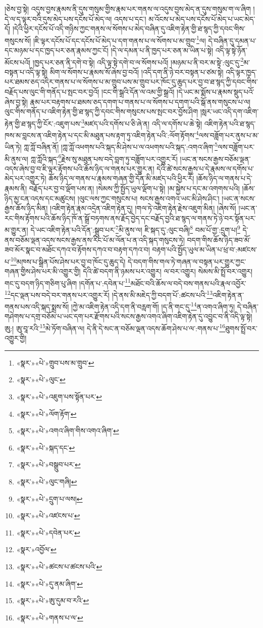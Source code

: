 །ཅེས་བྱ་སྟེ། འདུས་བྱས་རྣམས་ནི་དུས་གསུམ་གྱིས་རྣམ་པར་གནས་ལ་འདུས་བྱས་མེད་ན་དུས་གསུམ་ག་ལ་ཞིག །དེ་ལ་ད་ལྟར་བའི་དུས་མེད་པས་དངོས་པོ་མེད་ལ། འདས་པ་དང་། མ་འོངས་པ་མེད་པས་དངོས་པོ་མེད་པ་ཡང་མེད་དོ། །དེའི་ཕྱིར་དངོས་པོ་འདི་གཉིས་ཀྱང་གནས་ལ་སོགས་པ་མེད་བཞིན་དུ་འཇིག་རྟེན་གྱི་ཐ་སྙད་ཀྱི་དབང་གིས་གསུངས་སོ། །ཇི་ལྟར་དངོས་པོ་དང་དངོས་པོ་མེད་པ་དག་གནས་པ་ལ་སོགས་པ་མ་གྲུབ་\footnote{«སྣར་»«པེ་»གྲུབ་པས་མ་གྲུབ་}ལ། དེ་བཞིན་དུ་དམན་པ་དང་མཉམ་པ་དང་ཁྱད་པར་ཅན་རྣམས་ཀྱང་ངོ། །དེ་ལ་དམན་པ་ནི་ཁྱད་པར་ཅན་མ་ཡིན་པ་སྟེ། འདི་ལྟ་སྟེ་ཉོན་མོངས་པའོ། །ཁྱད་པར་ཅན་ནི་དགེ་བ་སྟེ། འདི་ལྟ་སྟེ་དགེ་བ་ལ་སོགས་པའོ། །མཉམ་པ་ནི་བར་མ་སྟེ་:ལུང་དུ་\footnote{«སྣར་»«པེ་»ལུང་}མ་བསྟན་པ་འདི་ལྟ་སྟེ། མིག་ལ་སོགས་པ་རྣམས་སོ་ཞེས་བྱ་བའོ། །འདི་དག་ནི་ཉེ་བར་བསྟན་པ་ཙམ་སྟེ། འདི་ལྟར་ཁྱད་པར་ཐམས་ཅད་འདིར་གནས་པ་ལ་སོགས་པ་མ་གྲུབ་པས་མ་གྲུབ་པར་ཁོང་དུ་ཆུད་པར་བྱ་བ་ཐ་སྙད་ཀྱི་དབང་གིས་བརྗོད་པས་ལུང་གི་གནོད་པ་སྤང་བར་བྱའོ། །ངང་གི་སྒྲའི་དོན་ལ་འམ་གྱི་སྒྲའོ། །དེ་ཡང་མ་སྨོས་པ་རྣམས་སྡུད་པའོ་ཞེས་བྱ་སྟེ། རྣམ་པར་བརྟགས་པ་ཐམས་ཅད་དགག་པ་གནས་པ་ལ་སོགས་པ་དགག་པའི་སྒོ་ནས་གསུངས་པ་ལ། ལུང་གིས་གནོད་པ་འཇིག་རྟེན་གྱི་ཐ་སྙད་ཀྱི་དབང་གིས་གསུངས་པས་སྤང་བར་བྱོས་ཤིག །སླར་ཡང་འདི་དག་འཇིག་རྟེན་གྱི་ཐ་སྙད་ཀྱི་ངོར་:འཇུག་པས་\footnote{«སྣར་»«པེ་»འཇུག་པས་སྟོན་པར་}མཛད་པའི་དགོས་པ་ཅི་ཞེ་ན། འདི་ལ་དགོས་པ་ཆེ་སྟེ། འཇིག་རྟེན་པའི་ཐ་སྙད་ཁས་མ་བླངས་ན་འཇིག་རྟེན་པ་དང་མི་མཐུན་པས་རྟག་ཏུ་འཇིག་རྟེན་པའི་:ལོག་རྟོགས་\footnote{«སྣར་»«པེ་»ལོག་རྟོག་}ལས་བཟློག་པར་ནུས་པ་མ་ཡིན་ཏེ། ཀླ་ཀློ་བཞིན་ནོ། །ཀླ་ཀློ་འཕགས་པའི་སྐད་མི་ཤེས་པ་ལ་འཕགས་པའི་སྐད་:འགའ་ཞིག་\footnote{«སྣར་»«པེ་»འགའ་ཞིག་གིས་འགའ་ཞིག་}ལས་བཟློག་པར་མི་ནུས་ལ། ཀླ་ཀློའི་སྐད་\footnote{«སྣར་»«པེ་»སྐད་དང་}རྗེས་སུ་མཐུན་པས་བདེ་བླག་ཏུ་བཟློག་པར་འགྱུར་རོ། །ཡང་ན་སངས་རྒྱས་བཅོམ་ལྡན་འདས་ཞེས་བྱ་བ་ཇི་ལྟར་རྟོགས་པའི་ཆོས་ཉིད་ལ་གནས་པར་གྱུར་ན། དེའི་ཚེ་སངས་རྒྱས་པ་དེ་རྣམས་ལ་དགོས་པ་མེད་པར་འགྱུར་ཏེ། ཆོས་ཉིད་ལ་གནས་པ་རྣམས་གཞན་གྱི་དོན་མི་མཛད་པའི་ཕྱིར་རོ། །ཆོས་ཉིད་ལ་གནས་པ་དེ་རྣམས་ནི། བརྗོད་པར་བྱ་བ་ལྡོག་པས་ན། །སེམས་ཀྱི་སྤྱོད་ཡུལ་ལྡོག་པ་སྟེ། །མ་སྐྱེས་པ་དང་མ་འགགས་པའི། །ཆོས་ཉིད་མྱ་ངན་འདས་དང་མཚུངས། །ལུང་ལས་ཀྱང་གསུངས་པ། སངས་རྒྱས་འགའ་ཡང་མི་ཤེས་ཤིང་། །ཡང་ན་སངས་རྒྱས་ཆོས་ཉིད་མིན། །འཇིག་རྟེན་རྣམ་འདྲེན་འཇིག་རྟེན་དུ། །གལ་ཏེ་འཇིག་རྟེན་རྗེས་འཇུག་མིན། །ཞེས་སོ། །ཡང་ན་རང་གིས་རྟོགས་པའི་ཆོས་ཉིད་ཁོ་ན་སྒྲོ་བཏགས་ནས་རྗོད་བྱེད་དང་བརྗོད་བྱའི་ཐ་སྙད་ལ་གནས་ཏེ་ཉེ་བར་སྟོན་པར་མ་གྱུར་ན། དེ་ཡང་འཇིག་རྟེན་པའི་དོན་:སྒྲུབ་པར་\footnote{«སྣར་»«པེ་»བསྒྲུབ་པར་}མི་ནུས་ལ། ཇི་སྐད་དུ་:ལུང་བཞི།\footnote{«སྣར་»«པེ་»ལུང་གཞི།} བམ་པོ་གྱ་:དྲུག་པ།\footnote{«སྣར་»«པེ་»དྲུག་པ་ལས།} དེ་ནས་བཅོམ་ལྡན་འདས་སངས་རྒྱས་ནས་རིང་པོ་མ་ལོན་པ་ན་འདི་སྐད་གསུངས་ཏེ། བདག་གིས་ཆོས་ཉིད་ཟབ་མོ་ཟབ་མོར་སྣང་བ་མཐོང་དཀའ་བ་རྟོགས་དཀའ་བ་བརྟག་དཀའ་བ། བརྟག་པའི་སྤྱོད་ཡུལ་མ་ཡིན་པ་ཕྲ་བ་:མཛངས་པ་\footnote{«སྣར་»«པེ་»འཛངས་པ་}མཁས་པ་སྒྲིན་པོས་ཤེས་པར་བྱ་བ་ཁོང་དུ་ཆུད་དེ། དེ་བདག་གིས་གལ་ཏེ་གཞན་ལ་བསྟན་པར་གྱུར་ཀྱང་གཞན་གྱིས་ཤེས་པར་མི་འགྱུར་གྱི། དེའི་ཚེ་བདག་ནི་ཉམས་པར་འགྱུར། ལ་བར་འགྱུར། སེམས་མི་སྤྲོ་བར་འགྱུར། གང་དུ་བདག་ཉིད་གཅིག་པུ་ཞིག །དགོན་པ་:དབེན་པ་\footnote{«སྣར་»«པེ་»དབེན་པར་}མཐོང་བའི་ཆོས་ལ་བདེ་བས་གནས་པའི་རྣལ་འབྱོར་\footnote{«སྣར་»འབྱོལ་}དང་ལྡན་པས་བདེ་བར་གནས་པར་འགྱུར་རོ། །དེ་ནས་མི་མཇེད་ཀྱི་བདག་པོ་:ཚངས་པའི་\footnote{«སྣར་»«པེ་»ཚངས་པ་ཚངས་པའི་}འཇིག་རྟེན་ན་གནས་པས་འདི་སྐད་སྨྲས་སོ། །ཀྱེ་མ་འཇིག་རྟེན་འདི་དག་ནི་བརླག་གོ། །ད་ནི་གང་དུ་\footnote{«སྣར་»«པེ་»དུ་ནམ་ཞིག་}ན་འགའ་ཞིག་ཏུ། དེ་བཞིན་གཤེགས་པ་དགྲ་བཅོམ་པ་ཡང་དག་པར་རྫོགས་པའི་སངས་རྒྱས་འགའ་ཞིག་འཇིག་རྟེན་དུ་འབྱུང་བ་ནི་འདི་ལྟ་སྟེ། ཨུ:། ཨུ་བཱ་རའི་\footnote{«སྣར་»«པེ་»ཨུ་དུམ་བ་རའི་}མེ་ཏོག་བཞིན་ལ། དེ་ནི་དེ་སང་ན་བཅོམ་ལྡན་འདས་ཆོག་ཤེས་པ་ལ་:གནས་པ་\footnote{«སྣར་»«པེ་»གནས་པ་ལ་}ཐུགས་སྤྲོ་བར་འགྱུར་གྱི། 